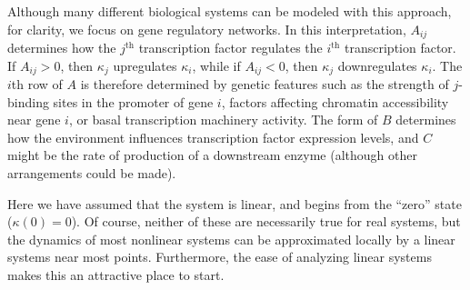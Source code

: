 \documentclass{article}
\newcommand{\1}{\mathbbm{1}}
\begin{document}
Although many different biological systems can be modeled with this approach, for clarity, we focus on gene regulatory networks.
In this interpretation, $A_{ij}$ determines how the $j^\text{th}$ transcription factor regulates the $i^\text{th}$ transcription factor.
If $A_{ij} > 0$, then $\kappa_j$ upregulates $\kappa_i$, while if $A_{ij} < 0$, then $\kappa_j$ downregulates $\kappa_i$.
The $i$th row of $A$ is therefore determined by genetic features such as
the strength of $j$-binding sites in the promoter of gene $i$,
factors affecting chromatin accessibility near gene $i$,
or basal transcription machinery activity.
The form of $B$ determines how the environment influences transcription factor expression levels,
and $C$ might be the rate of production of a downstream enzyme
(although other arrangements could be made).

Here we have assumed that the system is linear,
and begins from the ``zero'' state ($\kappa(0)=0$).
Of course, neither of these are necessarily true for real systems,
but the dynamics of most nonlinear systems can be approximated locally by a linear systems near most points. 
Furthermore, the ease of analyzing linear systems makes this an attractive place to start.  
\end{document}
